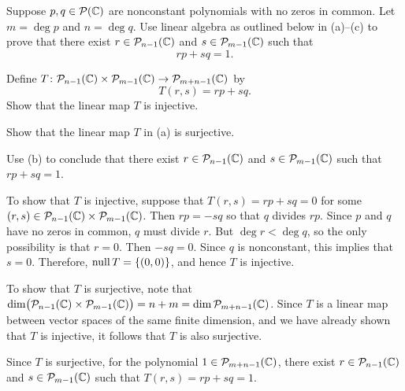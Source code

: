 \begin{exercise}
Suppose $p,q\in\mathcal{P}(\mathbb{C})$ are nonconstant polynomials with no zeros in common.
Let $m=\deg p$ and $n=\deg q$. Use linear algebra as outlined below in
(a)--(c) to prove that there exist $r\in\mathcal{P}_{n-1}(\mathbb{C})$ and
$s\in\mathcal{P}_{m-1}(\mathbb{C})$ such that
\[ rp+sq=1. \]
\begin{parts}
\item Define $T\colon\mathcal{P}_{n-1}(\mathbb{C})\times\mathcal{P}_{m-1}(\mathbb{C})\to\mathcal{P}_{m+n-1}(\mathbb{C})$
  by
  \[ T(r,s)=rp+sq. \]
  Show that the linear map $T$ is injective.
\item Show that the linear map $T$ in (a) is surjective.
\item Use (b) to conclude that there exist $r\in\mathcal{P}_{n-1}(\mathbb{C})$ and
  $s\in\mathcal{P}_{m-1}(\mathbb{C})$ such that $rp+sq=1$.
\end{parts}
\end{exercise}
\begin{solution}
\begin{parts}
\item To show that $T$ is injective, suppose that $T(r,s)=rp+sq=0$ for some
  $(r,s)\in\mathcal{P}_{n-1}(\mathbb{C})\times\mathcal{P}_{m-1}(\mathbb{C})$. Then $rp=-sq$ so that $q$
  divides $rp$. Since $p$ and $q$ have no zeros in common, $q$ must divide
  $r$. But $\deg r<\deg q$, so the only possibility is that $r=0$. Then
  $-sq=0$. Since $q$ is nonconstant, this implies that $s=0$. Therefore,
  $\operatorname{null} T=\{(0,0)\}$, and hence $T$ is injective.
\item To show that $T$ is surjective, note that
  $\operatorname{dim}\bigl(\mathcal{P}_{n-1}(\mathbb{C})\times\mathcal{P}_{m-1}(\mathbb{C})\bigr)=n+m
  =\operatorname{dim}\mathcal{P}_{m+n-1}(\mathbb{C})$. Since $T$ is a linear map between vector spaces of
  the same finite dimension, and we have already shown that $T$ is injective,
  it follows that $T$ is also surjective.
\item Since $T$ is surjective, for the polynomial $1\in\mathcal{P}_{m+n-1}(\mathbb{C})$,
  there exist $r\in\mathcal{P}_{n-1}(\mathbb{C})$ and $s\in\mathcal{P}_{m-1}(\mathbb{C})$ such that
  $T(r,s)=rp+sq=1$. \qedhere
\end{parts}
\end{solution}

\renewcommand\thesection{\thechapter\Alph{section}}
